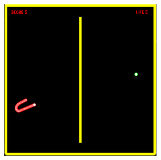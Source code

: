 \begin{DoxyInlineImage}
\includegraphics[height=\baselineskip,keepaspectratio=true]{snake1.png}%
\end{DoxyInlineImage}
     

